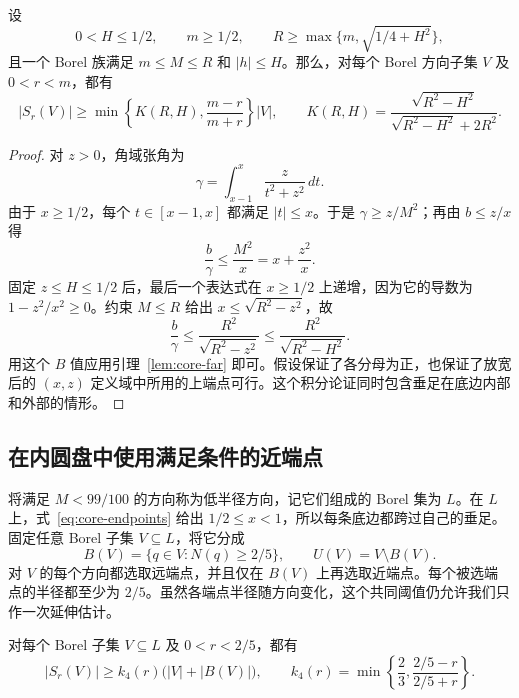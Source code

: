 \begin{lemma}[由端点半径上界控制角域]
\label{lem:core-bounded}
设
\[
 0<H\leq1/2,\qquad m\geq1/2,\qquad
 R\geq\max\{m,\sqrt{1/4+H^2}\},
\]
且一个 Borel 族满足 $m\leq M\leq R$ 和 $|h|\leq H$。那么，对每个 Borel 方向子集 $V$ 及 $0<r<m$，都有
\begin{equation}
 |S_r(V)|\geq
 \min\left\{K(R,H),\frac{m-r}{m+r}\right\}|V|,
 \qquad
 K(R,H)=\frac{\sqrt{R^2-H^2}}{\sqrt{R^2-H^2}+2R^2}.
\label{eq:core-bounded-kernel}
\end{equation}
\end{lemma}

\begin{proof}
对 $z>0$，角域张角为
\[
 \gamma=\int_{x-1}^{x}\frac{z}{t^2+z^2}\,dt.
\]
由于 $x\geq1/2$，每个 $t\in[x-1,x]$ 都满足 $|t|\leq x$。于是 $\gamma\geq z/M^2$；再由 $b\leq z/x$ 得
\[
                     \frac b\gamma\leq\frac{M^2}{x}
                                           =x+\frac{z^2}{x}.
\]
固定 $z\leq H\leq1/2$ 后，最后一个表达式在 $x\geq1/2$ 上递增，因为它的导数为 $1-z^2/x^2\geq0$。约束 $M\leq R$ 给出 $x\leq\sqrt{R^2-z^2}$，故
\[
 \frac b\gamma\leq\frac{R^2}{\sqrt{R^2-z^2}}
                  \leq\frac{R^2}{\sqrt{R^2-H^2}}.
\]
用这个 $B$ 值应用引理~\ref{lem:core-far} 即可。假设保证了各分母为正，也保证了放宽后的 $(x,z)$ 定义域中所用的上端点可行。这个积分论证同时包含垂足在底边内部和外部的情形。
\end{proof}

\subsection{在内圆盘中使用满足条件的近端点}
\label{subsec:core-low}

将满足 $M<99/100$ 的方向称为低半径方向，记它们组成的 Borel 集为 $L$。在 $L$ 上，式~\eqref{eq:core-endpoints} 给出 $1/2\leq x<1$，所以每条底边都跨过自己的垂足。固定任意 Borel 子集 $V\subseteq L$，将它分成
\begin{equation}
 B(V)=\{q\in V:N(q)\geq2/5\},\qquad U(V)=V\setminus B(V).
\label{eq:core-eligible-split}
\end{equation}
对 $V$ 的每个方向都选取远端点，并且仅在 $B(V)$ 上再选取近端点。每个被选端点的半径都至少为 $2/5$。虽然各端点半径随方向变化，这个共同阈值仍允许我们只作一次延伸估计。

\begin{lemma}[可选端点给出的下界]
\label{lem:core-eligible}
对每个 Borel 子集 $V\subseteq L$ 及 $0<r<2/5$，都有
\begin{equation}
 |S_r(V)|\geq k_4(r)\bigl(|V|+|B(V)|\bigr),\qquad
 k_4(r)=\min\left\{\frac23,\frac{2/5-r}{2/5+r}\right\}.
\label{eq:core-eligible}
\end{equation}
\end{lemma}

